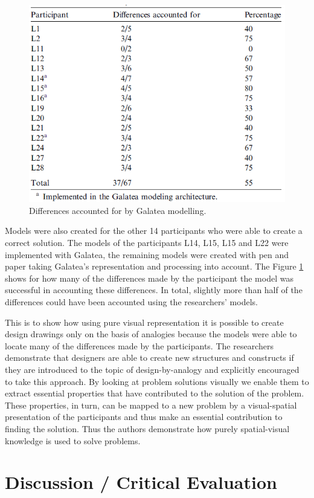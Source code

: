 \documentclass[12pt]{article}
\begin{document}
\begin{figure}[H]
  \centering
  \includegraphics[width=0.7\linewidth]{images/differences_found.PNG}
  \caption{\label{fig:differences_found}Differences accounted for by Galatea modelling. \\ \protect\cite[p. 211]{davies2009computational}}
\end{figure}  

Models were also created for the other 14 participants who were able to create a correct solution. The models of the participants L14, L15, L15 and L22 were implemented with Galatea, the remaining models were created with pen and paper taking Galatea's representation and processing into account. The Figure \ref{fig:differences_found} shows for how many of the differences made by the participant the model was successful in accounting these differences. In total, slightly more than half of the differences could have been accounted using the researchers' models. 

This is to show how using pure visual representation it is possible to create design drawings only on the basis of analogies because the models were able to locate many of the differences made by the participants. The researchers demonstrate that designers are able to create new structures and constructs if they are introduced to the topic of design-by-analogy and explicitly encouraged to take this approach. By looking at problem solutions visually we enable them to extract essential properties that have contributed to the solution of the problem. These properties, in turn, can be mapped to a new problem by a visual-spatial presentation of the participants and thus make an essential contribution to finding the solution. Thus the authors demonstrate how purely spatial-visual knowledge is used to solve problems. 


\section{Discussion / Critical Evaluation}
\end{document}
